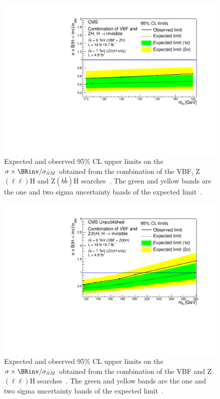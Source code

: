 \begin{figure}
  \includegraphics[width=\largefigwidth]{plots/prompt/HIG-13-30-figs/combinedlimit.pdf}
  \caption{Expected and observed 95\% \ac{CL} upper limits on the $\sigma\times\BRinv/\sigma_{SM}$ obtained from the combination of the \ac{VBF}, Z$(\ell\ell)$H and Z$(b\bar{b})$H searches~\cite{Chatrchyan:2014tja}. The green and yellow bands are the one and two sigma uncertainty bands of the expected limit~\cite{Chatrchyan:2014tja}.}
  \label{fig:promptcomb}
\end{figure}

\begin{figure}
  \includegraphics[width=\largefigwidth]{plots/prompt/HIG-13-30-figs/highmasslimit.pdf}
  \caption{Expected and observed 95\% \ac{CL} upper limits on the $\sigma\times\BRinv/\sigma_{SM}$ obtained from the combination of the \ac{VBF} and Z$(\ell\ell)$H searches~\cite{Chatrchyan:2014tja}. The green and yellow bands are the one and two sigma uncertainty bands of the expected limit~\cite{Chatrchyan:2014tja}.}
  \label{fig:promptcombhighmass}
\end{figure}

